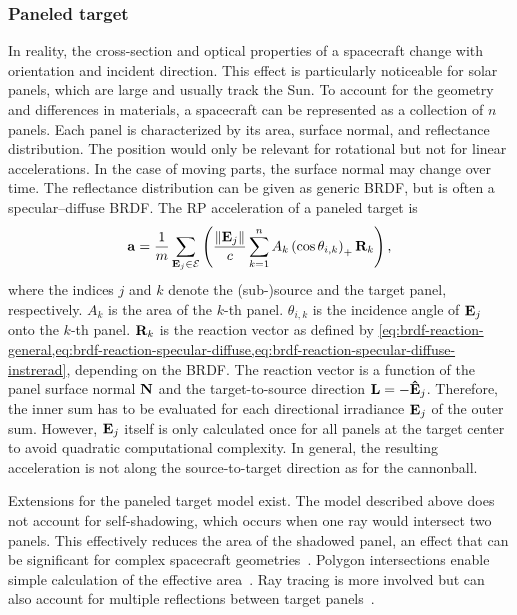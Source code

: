 \subsubsection{Paneled target}
In reality, the cross-section and optical properties of a spacecraft change with orientation and incident direction. This effect is particularly noticeable for solar panels, which are large and usually track the Sun. To account for the geometry and differences in materials, a spacecraft can be represented as a collection of $n$ panels. Each panel is characterized by its area, surface normal, and reflectance distribution. The position would only be relevant for rotational but not for linear accelerations. In the case of moving parts, the surface normal may change over time. The reflectance distribution can be given as generic \gls{BRDF}, but is often a specular--diffuse \gls{BRDF}. The \gls{RP} acceleration of a paneled target is~\cite{Marshall1992}
\begin{align}
    \label{eq:paneled-target}
    \vb a = \frac{1}{m} \sum_{\vb E_j \in \mathcal{E}} \left( \frac{\norm{\vb E_j}}{c} \sum_{k=1}^n A_k \left(\cos\theta_{i,k}\right)_+ \vb R_k\right),
\end{align}
where the indices $j$ and $k$ denote the (sub-)source and the target panel, respectively. $A_k$ is the area of the $k$-th panel. $\theta_{i,k}$ is the incidence angle of $\vb E_j$ onto the $k$-th panel. $\vb R_k$ is the reaction vector as defined by {\renewcommand\creflastconjunction{ or }\cref{eq:brdf-reaction-general,eq:brdf-reaction-specular-diffuse,eq:brdf-reaction-specular-diffuse-instrerad}}, depending on the \gls{BRDF}. The reaction vector is a function of the panel surface normal $\vb N$ and the target-to-source direction $\vb L = -\vu E_j$. Therefore, the inner sum has to be evaluated for each directional irradiance $\vb E_j$ of the outer sum. However, $\vb E_j$ itself is only calculated once for all panels at the target center to avoid quadratic computational complexity. In general, the resulting acceleration is not along the source-to-target direction as for the cannonball.

Extensions for the paneled target model exist. The model described above does not account for self-shadowing, which occurs when one ray would intersect two panels. This effectively reduces the area of the shadowed panel, an effect that can be significant for complex spacecraft geometries~\cite{Mazarico2009}. Polygon intersections enable simple calculation of the effective area~\cite{Mazarico2009}. Ray tracing is more involved but can also account for multiple reflections between target panels~\cite{Kenneally2020}.

